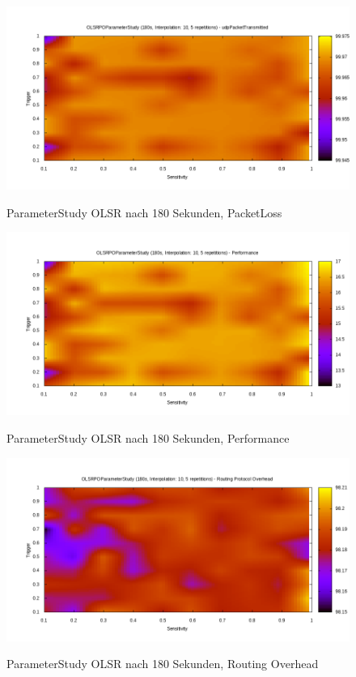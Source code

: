 \begin{figure}
  \centering
  \includegraphics[scale=0.55]{bilder/ops2.png} \\
  \caption{ParameterStudy OLSR nach 180 Sekunden, PacketLoss}
  \label{image:omnet:olsr:two}
\end{figure}

\begin{figure}
  \centering
  \includegraphics[scale=0.55]{bilder/ops3.png} \\
  \caption{ParameterStudy OLSR nach 180 Sekunden, Performance}
  \label{image:omnet:olsr:three}
\end{figure}

\begin{figure}
  \centering
  \includegraphics[scale=0.55]{bilder/ops6.png} \\
  \caption{ParameterStudy OLSR nach 180 Sekunden, Routing Overhead}
  \label{image:omnet:olsr:six}
\end{figure}

